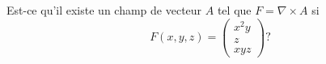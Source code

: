 
\begin{exercice}\label{exoOutilsMath-0036}

    Est-ce qu'il existe un champ de vecteur $A$ tel que $F=\nabla\times A$ si
    \begin{equation}
        F(x,y,z)=\begin{pmatrix}
            x^2 y   \\ 
              z  \\ 
            xyz    
        \end{pmatrix} ?
    \end{equation} 
    

\end{exercice}
